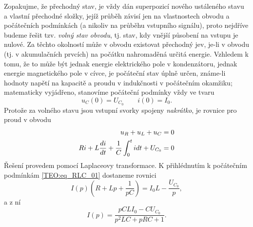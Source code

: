     Zopakujme, že přechodný stav, je vždy dán superpozicí nového ustáleného stavu a vlastní 
    přechodné složky, jejíž průběh závisí jen na vlastnostech obvodu a počátečních podmínkách (a 
    nikoliv na průběhu vstupního signálu), proto nejdříve budeme řešit tzv. \emph{volný stav 
    obvodu}, tj. stav, kdy vnější působení na vstupu je nulové. Za těchto okolností může v obvodu 
    existovat přechodný jev, je-li v obvodu (tj. v akumulačních prvcích) na počátku nahromaděná 
    určitá energie. Vzhledem k tomu, že to může být jednak energie elektrického pole v kondenzátoru, 
    jednak energie magnetického pole v cívce, je počáteční stav úplně určen, známe-li hodnoty napětí 
    na kapacitě a proudu v indukčnosti v počátečním okamžiku; matematicky vyjádřeno, stanovíme 
    počáteční podmínky vždy ve tvaru
    \begin{equation}\label{TEO:eq_RLC_00}
      u_C(0) = U_{C_0} \qquad i(0) = I_0.
    \end{equation}    
    Protože za volného stavu jsou vstupní svorky spojeny \emph{nakrátko}, je rovnice pro proud v
    obvodu
    \begin{align}\label{TEO:eq_RLC_01}
       u_R + u_L + u_C                                    &= 0 \\
       Ri + L\frac{d i}{d t} +\frac{1}{C}\int_0^tidt + U_{C_0} &= 0
    \end{align}     
    Řešení provedem pomocí Laplaceovy transformace. K přihlédnutím  k počátečním podmínkám
    \ref{TEO:eq_RLC_01} dostaneme rovnici
    \begin{equation}\label{TEO:eq_RLC_02}
      I(p)(R + Lp + \frac{1}{pC}) = I_0L - \frac{U_{C_0}}{p},
    \end{equation}     
    a z ní 
    \begin{equation}\label{TEO:eq_RLC_03}
      I(p) = \frac{pCLI_0 - CU_{C_0}}{p^2LC + pRC + 1}.
    \end{equation}

\printbibliography[heading=subbibliography]